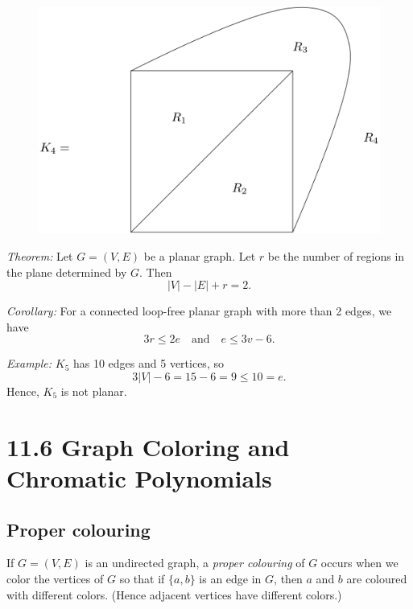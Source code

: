 \documentclass[11pt]{article}
\begin{document}
    \begin{figure}[H]
        \centering
        \includegraphics[scale=0.2]{region.png}
    \end{figure}

    \emph{Theorem:} Let \(G = (V,E)\) be a planar graph. Let $r$ be the number of regions in the plane determined by $G$. Then \[|V| - |E| + r = 2.\]

    \emph{Corollary:} For a connected loop-free planar graph with more than 2 edges, we have \[3r \leq 2e \quad \text{and} \quad e \leq 3v - 6.\]

    \emph{Example:} \(K_5\) has 10 edges and 5 vertices, so \[3|V| - 6 = 15 - 6 = 9 \leq 10 = e.\] Hence, \(K_5\) is not planar.

    \section{11.6 Graph Coloring and Chromatic Polynomials}

    \subsection{Proper colouring}

    If \(G = (V,E)\) is an undirected graph, a \emph{proper colouring} of $G$ occurs when we color the vertices of $G$ so that if \(\{a,b\}\) is an edge in $G$, then $a$ and $b$ are coloured with different colors. (Hence adjacent vertices have different colors.)
\end{document}
